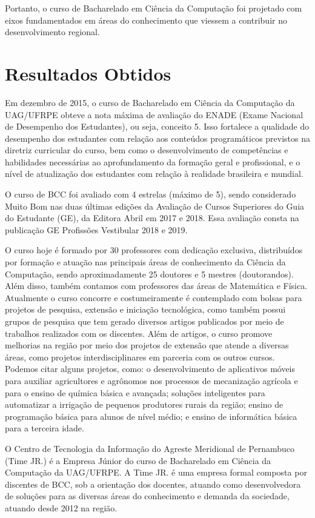 \documentclass[
	12pt,				%
	openright,			%
  oneside,     %
	a4paper,			%
	chapter=TITLE,		%
	english,			%
	french,				%
	spanish,			%
	brazil				%
	]{abntex2}
\begin{document}
Portanto, o curso de Bacharelado em Ciência da Computação foi projetado com eixos fundamentados em áreas do conhecimento que viessem a contribuir no desenvolvimento regional.

\section{Resultados Obtidos}

Em dezembro de 2015, o curso de Bacharelado em Ciência da Computação da UAG/UFRPE obteve a nota máxima de avaliação do ENADE (Exame Nacional de Desempenho dos Estudantes), ou seja, conceito 5. Isso fortalece a qualidade do desempenho dos estudantes com relação aos conteúdos programáticos previstos na diretriz curricular do curso, bem como o desenvolvimento de competências e habilidades necessárias ao aprofundamento da formação geral e profissional, e o nível de atualização dos estudantes com relação à realidade brasileira e mundial.

O curso de BCC foi avaliado com 4 estrelas (máximo de 5), sendo considerado Muito Bom nas duas últimas edições da Avaliação de Cursos Superiores do Guia do Estudante (GE), da Editora Abril em 2017 e 2018. Essa avaliação consta na publicação GE Profissões Vestibular 2018 e 2019.

O curso hoje é formado por 30 professores com dedicação exclusiva, distribuídos por formação e atuação nas principais áreas de conhecimento da Ciência da Computação, sendo aproximadamente 25 doutores e 5 mestres (doutorandos). Além disso, também contamos com professores das áreas de Matemática e Física. Atualmente o curso concorre e costumeiramente é contemplado com bolsas para projetos de pesquisa, extensão e iniciação tecnológica, como também possui grupos de pesquisa que tem gerado diversos artigos publicados por meio de trabalhos realizados com os discentes. Além de artigos, o curso promove melhorias na região por meio dos projetos de extensão que atende a diversas áreas, como projetos interdisciplinares em parceria com os outros cursos. Podemos citar alguns projetos, como: o desenvolvimento de aplicativos móveis para auxiliar agricultores e agrônomos nos processos de mecanização agrícola e para o ensino de química básica e avançada; soluções inteligentes para automatizar a irrigação de pequenos produtores rurais da região; ensino de programação básica para alunos de nível médio; e ensino de informática básica para a terceira idade.

O Centro de Tecnologia da Informação do Agreste Meridional de Pernambuco (Time JR.) é a Empresa Júnior do curso de Bacharelado em Ciência da Computação da UAG/UFRPE. A Time JR. é uma empresa formal composta por discentes de BCC, sob a orientação dos docentes, atuando como desenvolvedora de soluções para as diversas áreas do conhecimento e demanda da sociedade, atuando desde 2012 na região. 
\end{document}
